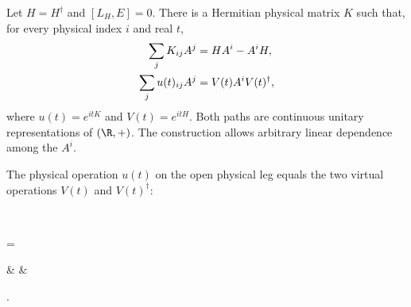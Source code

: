 \begin{lemma}
    \label{thm:continuous_physical_generator}
    \leanok
    Let $H=H^\dagger$ and $[L_H,E]=0$. There is a Hermitian physical
    matrix $K$ such that, for every physical index $i$ and real $t$,
    \begin{align}
        \sum_jK_{ij}A^j     & =HA^i-A^iH,\notag     \\
        \sum_j u(t)_{ij}A^j & =V(t)A^iV(t)^\dagger,
        \label{eq:symmetry_continuous_covariance}
    \end{align}
    where $u(t)=e^{itK}$ and $V(t)=e^{itH}$. Both paths are continuous
    unitary representations of $(\R,+)$.
    The construction allows arbitrary linear dependence among the $A^i$.

    The physical operation $u(t)$ on the open physical leg equals the two
    virtual operations $V(t)$ and $V(t)^\dagger$:
    \begin{tenkzequation}
        \tenkzkernel
        \begin{tenkz}[rows={op,ket}, cols=1]
             \\
        \end{tenkz}
        =
        \begin{tenkz}[boundary=open]
             &  &
        \end{tenkz}.
    \end{tenkzequation}
\end{lemma}
